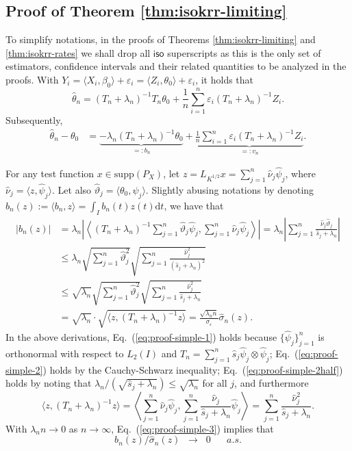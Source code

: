 \documentclass[11pt,a4paper]{article}
\renewcommand{\hat}{\widehat}
\theoremstyle{definition}
\theoremstyle{plain}
\theoremstyle{remark}
\newcommand{\supp}{\mathrm{supp}}
\newcommand{\ud}{\mathrm d}
\newcommand{\iso}{\mathsf{iso}}
\begin{document}
\subsection{Proof of Theorem \ref{thm:isokrr-limiting}}

To simplify notations, in the proofs of Theorems \ref{thm:isokrr-limiting} and \ref{thm:isokrr-rates} we shall drop all $\iso$ superscripts as this is the only set of estimators, confidence intervals and their related
quantities to be analyzed in the proofs.
With $Y_i=\langle X_i,\beta_0\rangle+\varepsilon_i = \langle Z_i,\theta_0\rangle+\varepsilon_i$, it holds that
$$
\hat\theta_n = (T_n+\lambda_n)^{-1}T_n\theta_0 + \frac{1}{n}\sum_{i=1}^n\varepsilon_i (T_n+\lambda_n)^{-1}Z_i.
$$
Subsequently,
\begin{align}
\hat\theta_n-\theta_0 &= \underbrace{-\lambda_n (T_n+\lambda_n)^{-1}\theta_0}_{=: b_n} + \underbrace{\frac{1}{n}\sum_{i=1}^n\varepsilon_i(T_n+\lambda_n)^{-1}Z_i}_{=:v_n}.
\end{align}

For any test function $x\in\supp(P_X)$, let $z=L_{K^{1/2}}x=\sum_{j=1}^{n}\hat\nu_j\hat\psi_j$, where $\hat\nu_j=\langle z,\hat\psi_j\rangle$.
Let also $\hat\vartheta_j = \langle\theta_0,\hat\psi_j\rangle$.
Slightly abusing notations by denoting $b_n(z) := \langle b_n,z\rangle = \int_I b_n(t)z(t)\ud t$, we have that
\begin{align}
\big|b_n(z)\big| &= \lambda_n\left|\left\langle(T_n+\lambda_n)^{-1}\sum_{j=1}^n\hat\vartheta_j\hat\psi_j, \sum_{j=1}^n\hat\nu_j\hat\psi_j\right\rangle\right|
= \lambda_n \left|\sum_{j=1}^n \frac{\hat\nu_j\hat\vartheta_j}{\hat s_j+\lambda_n}\right|\label{eq:proof-simple-1}\\
&\leq \lambda_n \sqrt{\sum_{j=1}^n\hat\vartheta_j^2}\sqrt{\sum_{j=1}^n\frac{\hat\nu_j^2}{(\hat s_j+\lambda_n)^2}} \label{eq:proof-simple-2}\\
&\leq \sqrt{\lambda_n}\sqrt{\sum_{j=1}^n\hat\vartheta_j^2}\sqrt{\sum_{j=1}^n\frac{\hat\nu_j^2}{\hat s_j+\lambda_n}}\label{eq:proof-simple-2half}\\
&= \sqrt{\lambda_n}\cdot \sqrt{\langle z,(T_n+\lambda_n)^{-1}z\rangle} = {\frac{\sqrt{\lambda_nn}}{\sigma_\varepsilon}\hat\sigma_n(z)}.\label{eq:proof-simple-3}
\end{align}
In the above derivations, Eq.~(\ref{eq:proof-simple-1}) holds because $\{\hat\psi_j\}_{j=1}^n$ is orthonormal with respect to $L_2(I)$ and $T_n=\sum_{j=1}^n\hat s_j\hat\psi_j\otimes\hat\psi_j$;
Eq.~(\ref{eq:proof-simple-2}) holds by the Cauchy-Schwarz inequality;
Eq.~(\ref{eq:proof-simple-2half}) holds by noting that $\lambda_n/(\sqrt{\hat s_j+\lambda_n})\leq\sqrt{\lambda_n}$ for all $j$, and furthermore
$$
\langle z, (T_n+\lambda_n)^{-1}z\rangle = \left\langle\sum_{j=1}^n\hat\nu_j\hat\psi_j, \sum_{j=1}^n\frac{\hat\nu_j}{\hat s_j+\lambda_n}\hat\psi_j\right\rangle = \sum_{j=1}^n\frac{\hat\nu_j^2}{\hat s_j+\lambda_n}.
$$
With $\lambda_n n\to 0$ as $n\to\infty$, Eq.~(\ref{eq:proof-simple-3}) implies that
$$
b_n(z)/\hat\sigma_n(z)\;\;\to\;\;0\;\;\;\;\;\;a.s.
$$
\end{document}
